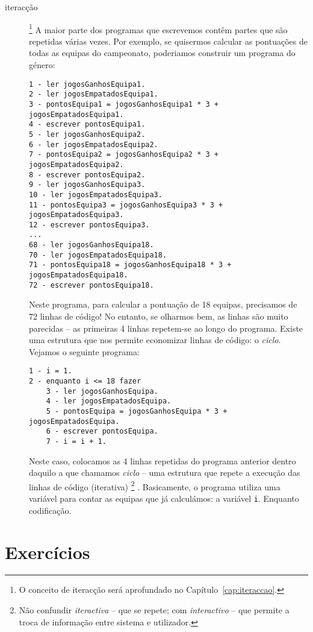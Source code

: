 \begin{description}
\item[iteracção]\footnote{O conceito de iteracção será aprofundado no Capítulo~\ref{cap:iteraccao}.}
A maior parte dos programas que escrevemos contêm partes que são repetidas várias vezes. Por exemplo, se quisermos calcular as pontuações de todas as equipas do campeonato, poderiamos construir um programa do género:
{\small
\begin{verbatim}
1 - ler jogosGanhosEquipa1.
2 - ler jogosEmpatadosEquipa1.
3 - pontosEquipa1 = jogosGanhosEquipa1 * 3 + jogosEmpatadosEquipa1.
4 - escrever pontosEquipa1.
5 - ler jogosGanhosEquipa2.
6 - ler jogosEmpatadosEquipa2.
7 - pontosEquipa2 = jogosGanhosEquipa2 * 3 + jogosEmpatadosEquipa2.
8 - escrever pontosEquipa2.
9 - ler jogosGanhosEquipa3.
10 - ler jogosEmpatadosEquipa3.
11 - pontosEquipa3 = jogosGanhosEquipa3 * 3 + jogosEmpatadosEquipa3.
12 - escrever pontosEquipa3.
...
68 - ler jogosGanhosEquipa18.
70 - ler jogosEmpatadosEquipa18.
71 - pontosEquipa18 = jogosGanhosEquipa18 * 3 + jogosEmpatadosEquipa18.
72 - escrever pontosEquipa18.
\end{verbatim}}
Neste programa, para calcular a pontuação de 18 equipas, precisamos de 72 linhas de código! No entanto, se olharmos bem, as linhas são muito parecidas -- as primeiras 4 linhas repetem-se ao longo do programa. Existe uma estrutura que nos permite economizar linhas de código: o \emph{ciclo}. Vejamos o seguinte programa:
{\small
\begin{verbatim}
1 - i = 1.
2 - enquanto i <= 18 fazer
    3 - ler jogosGanhosEquipa.
    4 - ler jogosEmpatadosEquipa.
    5 - pontosEquipa = jogosGanhosEquipa * 3 + jogosEmpatadosEquipa.
    6 - escrever pontosEquipa.
    7 - i = i + 1.
\end{verbatim}}
Neste caso, colocamos as 4 linhas repetidas do programa anterior dentro daquilo a que chamamos \emph{ciclo} -- uma estrutura que repete a execução das linhas de código (iterativa)%
\footnote{Não confundir \emph{iteractiva} -- que se repete; com \emph{interactivo} -- que permite a troca de informação entre sistema e utilizador.}%
. 
Basicamente, o programa utiliza uma variável para contar as equipas que já calculámos: a variável \texttt{i}. Enquanto 
codificação.

\end{description}



\section{Exercícios}

